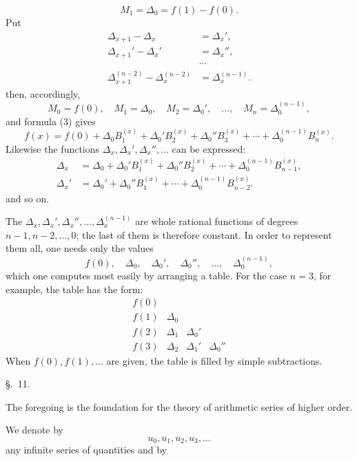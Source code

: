
\[
M_1=\Delta_0=f(1)-f(0).
\]
Put
\begin{equation}
\begin{aligned}
 \Delta_{x+1}-\Delta_x&=\Delta_x',\\
 \Delta_{x+1}'-\Delta_x'&=\Delta_x'',\\
 &\cdots\\
 \Delta_{x+1}^{(n-2)}-\Delta_x^{(n-2)}&=\Delta_x^{(n-1)}.
\end{aligned}
\tag{6}
\end{equation}
then, accordingly,
\[
 M_0=f(0),\quad M_1=\Delta_0,
 \quad M_2=\Delta_0',\quad\ldots,\quad M_n=\Delta_0^{(n-1)},
\]
and formula (3) gives
\begin{equation}
 f(x)=f(0)+\Delta_0B_1^{(x)}+\Delta_0'B_2^{(x)}+\Delta_0''B_3^{(x)}+\cdots+\Delta_0^{(n-1)}B_n^{(x)}.
\tag{7}
\end{equation}
Likewise the functions $\Delta_x,\Delta_x',\Delta_x'',\ldots$ can be expressed:
\begin{equation}
\begin{aligned}
 \Delta_x&=\Delta_0+\Delta_0'B_1^{(x)}+\Delta_0''B_2^{(x)}+\cdots+\Delta_0^{(n-1)}B_{n-1}^{(x)},\\
 \Delta_x'&=\Delta_0'+\Delta_0''B_1^{(x)}+\cdots+\Delta_0^{(n-1)}B_{n-2}^{(x)}.
\end{aligned}
\tag{8}
\end{equation}
and so on.

The $\Delta_x,\Delta_x',\Delta_x'',\ldots,\Delta_x^{(n-1)}$ are whole rational functions of degrees $n-1,n-2,\ldots,0$; the last of them is therefore constant. In order to represent them all, one needs only the values
\[
 f(0),\quad \Delta_0,\quad \Delta_0',\quad \Delta_0'',\quad\ldots,\quad \Delta_0^{(n-1)},
\]
which one computes most easily by arranging a table. For the case $n=3$, for example, the table has the form:
\[
\begin{array}{c|c|c|c}
f(0) &&&\\
f(1)&\Delta_0&&\\
f(2)&\Delta_1&\Delta_0'&\\
f(3)&\Delta_2&\Delta_1'&\Delta_0''
\end{array}
\]
When $f(0),f(1),\ldots$ are given, the table is filled by simple subtractions.

\begin{center}
{\large \S.\ 11.}

\vspace{0.5em}
{\large{}}
\end{center}

The foregoing is the foundation for the theory of arithmetic series of higher order.

We denote by
\begin{equation}
 u_0,u_1,u_2,u_3,\ldots
\tag{1}
\end{equation}
any infinite series of quantities and by
